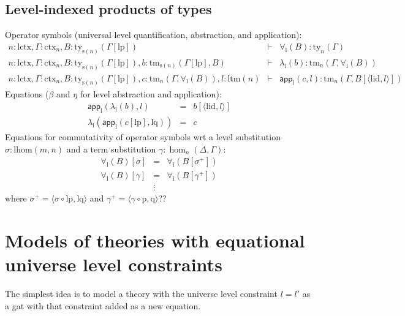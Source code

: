 \documentclass[11pt,a4paper]{article}
\theoremstyle{definition}
\newcommand{\app}[2]{{#1\,#2}} %
\def\lhom{\mathrm{lhom}}
\def\lctx{\mathrm{lctx}}
\def\ltm{\mathrm{ltm}}
\def\lid{\mathrm{lid}}
\def\lp{\mathrm{lp}}
\def\lq{\mathrm{lq}}
\def\s{\mathrm{s}}
\newcommand{\ctx}{\mathrm{ctx}}
\newcommand{\ty}{\mathrm{ty}}
\newcommand{\tm}{\mathrm{tm}}
\newcommand{\tuple}[1]{\langle #1 \rangle}
\def\p{\mathrm{p}}
\def\q{\mathrm{q}}
\def\app{\mathsf{app}}
\begin{document}
\subsection{Level-indexed products of types}
\def\l{\mathrm{l}}
\begin{tiny}
Operator symbols (universal level quantification, abstraction, and application):
\begin{eqnarray*}
n : \lctx, \Gamma : \ctx_n, B : \ty_{\s(n)}(\Gamma[\lp])&\vdash& \forall_\l(B) : \ty_n(\Gamma)\\
n : \lctx, \Gamma : \ctx_n, B : \ty_{\s(n)}(\Gamma[\lp]), b : \tm_{\s(n)}(\Gamma[\lp], B) &\vdash& \lambda_\l(b) : \tm_n(\Gamma,\forall_\l(B))\\
n : \lctx, \Gamma : \ctx_n, B : \ty_{\s(n)}(\Gamma[\lp]), c :  \tm_n(\Gamma,\forall_\l(B)), l : \ltm(n) &\vdash& \app_\l(c,l) : \tm_n(\Gamma, B[\tuple{\lid,l}])
\end{eqnarray*}
Equations ($\beta$ and $\eta$ for level abstraction and application):
 \begin{eqnarray*}
 \app_\l(\lambda_\l(b),l) &=& b[\tuple{\lid,l}]\\
 \lambda_\l(\app_\l(c[\lp],\lq)) &=& c
 \end{eqnarray*}
 Equations for commutativity of operator symbols wrt a level substitution $\sigma : \lhom(m,n)$ and a term substitution $\gamma : \hom_n(\Delta,\Gamma)$:
 \begin{eqnarray*}
 \forall_\l(B)[ \sigma ] &=& \forall_\l(B[ \sigma^{+}])\\
 \forall_\l(B)[ \gamma ] &=& \forall_\l(B[ \gamma^+ ])\\
&\vdots&
\end{eqnarray*}
where $\sigma^+ = \tuple{\sigma \circ \lp, \lq}$ and $\gamma^+ = \tuple{\gamma \circ \p, \q}$??
\end{tiny}

\section{Models of theories with equational universe level constraints}

The simplest idea is to model a theory with the universe level constraint $l = l'$ as a gat with that constraint added as a new equation.
\end{document}
